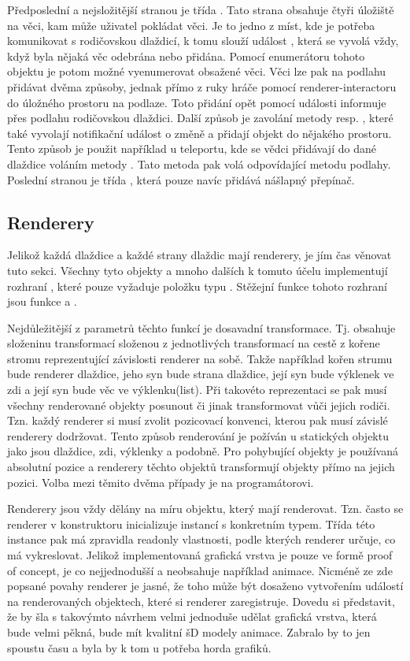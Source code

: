 Předposlední a nejsložitější stranou je třída  .  Tato strana obsahuje čtyři úložiště na věci,
kam může uživatel pokládat věci. Je to jedno z míst, kde je potřeba komunikovat s rodičovskou dlaždicí, k tomu
slouží událost , která se vyvolá vždy, když byla nějaká věc odebrána nebo přidána.
Pomocí enumerátoru tohoto objektu je potom možné vyenumerovat obsažené věci. Věci lze pak na podlahu přidávat dvěma 
způsoby, jednak přímo z ruky hráče pomocí renderer-interactoru do úložného prostoru na podlaze. Toto
přidání opět pomocí události informuje přes podlahu rodičovskou dlaždici. Další způsob je zavolání metody 
 resp. ,  které také vyvolají notifikační událost o změně a přidají objekt do nějakého prostoru.
Tento způsob je použit například u teleportu, kde se vědci přidávají do dané dlaždice voláním metody .
Tato metoda pak volá odpovídající metodu podlahy. Poslední stranou je  třída , která pouze navíc přidává 
nášlapný přepínač.

\subsection{Renderery}
Jelikož každá dlaždice a každé strany dlaždic mají renderery, je jím čas věnovat tuto sekci. Všechny tyto objekty
a mnoho dalších k tomuto účelu implementují rozhraní , které pouze vyžaduje  položku typu . 
Stěžejní funkce tohoto rozhraní jsou funkce  a . 

Nejdůležitější z parametrů těchto funkcí je dosavadní transformace. Tj. obsahuje složeninu transformací složenou z jednotlivých
transformací na cestě z kořene stromu reprezentující závislosti renderer na sobě. Takže například kořen strumu bude renderer
dlaždice, jeho syn bude strana dlaždice, její syn bude výklenek ve zdi a její syn bude věc ve
výklenku(list). Při takovéto reprezentaci se pak musí všechny renderované objekty posunout či jinak transformovat vůči jejich rodiči.
Tzn. každý renderer si musí zvolit pozicovací konvenci, kterou pak musí závislé renderery dodržovat. Tento způsob renderování je požíván u statických objektu jako
jsou dlaždice, zdi, výklenky a podobně. Pro pohybující objekty je používaná absolutní pozice a renderery
těchto objektů transformují objekty přímo na jejich pozici. Volba mezi těmito dvěma případy je na programátorovi.

Renderery jsou vždy dělány na míru objektu, který mají renderovat. Tzn. často se renderer v konstruktoru 
inicializuje instancí s konkretním typem. Třída této instance pak má zpravidla readonly vlastnosti,
podle kterých renderer určuje, co má vykreslovat. Jelikož implementovaná grafická vrstva je pouze ve formě proof of concept,
je co nejjednodušší a neobsahuje například animace. Nicméně ze zde popsané povahy renderer je jasné, že 
toho může být dosaženo vytvořením událostí na renderovaných objektech, které si renderer zaregistruje.
Dovedu si představit, že by šla s takovýmto návrhem velmi jednoduše udělat grafická vrstva, která bude
velmi pěkná, bude mít kvalitní šD modely animace. Zabralo by to jen spoustu času a byla by k tom u potřeba horda grafiků.

